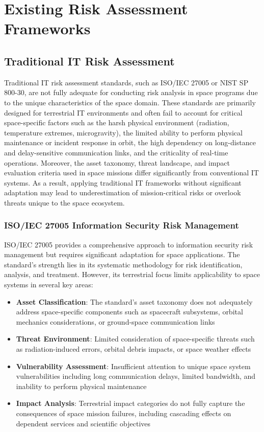 \documentclass[binding=0.6cm]{sapthesis}
\begin{document}
\section{Existing Risk Assessment Frameworks}

\subsection{Traditional IT Risk Assessment}

Traditional IT risk assessment standards, such as ISO/IEC 27005 or NIST SP 800-30, are not fully adequate for conducting risk analysis in space programs due to the unique characteristics of the space domain. These standards are primarily designed for terrestrial IT environments and often fail to account for critical space-specific factors such as the harsh physical environment (radiation, temperature extremes, microgravity), the limited ability to perform physical maintenance or incident response in orbit, the high dependency on long-distance and delay-sensitive communication links, and the criticality of real-time operations. Moreover, the asset taxonomy, threat landscape, and impact evaluation criteria used in space missions differ significantly from conventional IT systems. As a result, applying traditional IT frameworks without significant adaptation may lead to underestimation of mission-critical risks or overlook threats unique to the space ecosystem.

\subsubsection{ISO/IEC 27005 Information Security Risk Management}

ISO/IEC 27005 provides a comprehensive approach to information security risk management but requires significant adaptation for space applications. The standard's strength lies in its systematic methodology for risk identification, analysis, and treatment. However, its terrestrial focus limits applicability to space systems in several key areas:

\begin{itemize}
    \item \textbf{Asset Classification}: The standard's asset taxonomy does not adequately address space-specific components such as spacecraft subsystems, orbital mechanics considerations, or ground-space communication links
    \item \textbf{Threat Environment}: Limited consideration of space-specific threats such as radiation-induced errors, orbital debris impacts, or space weather effects
    \item \textbf{Vulnerability Assessment}: Insufficient attention to unique space system vulnerabilities including long communication delays, limited bandwidth, and inability to perform physical maintenance
    \item \textbf{Impact Analysis}: Terrestrial impact categories do not fully capture the consequences of space mission failures, including cascading effects on dependent services and scientific objectives
\end{itemize}
\end{document}
